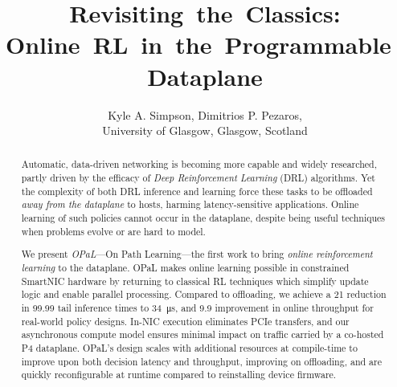 \documentclass[
conference
,10pt
]{IEEEtran}
\newcommand{\approach}{On Path Learning}
\newcommand{\approachshort}{OPaL}
\begin{document}
	\title{Revisiting~the~Classics: Online~RL~in~the~Programmable~Dataplane}
	
	
	 \author{Kyle A. Simpson, Dimitrios P. Pezaros,\\University of Glasgow, Glasgow, Scotland}

%
%
	

\maketitle
	
\begin{abstract}
Automatic, data-driven networking is becoming more capable and widely researched, partly driven by the efficacy of \emph{Deep Reinforcement Learning} (DRL) algorithms.
Yet the complexity of both DRL inference and learning force these tasks to be offloaded \emph{away from the dataplane} to hosts, harming latency-sensitive applications.
Online learning of such policies cannot occur in the dataplane, despite being useful techniques when problems evolve or are hard to model.

We present \emph{\approachshort{}}---\approach{}---the first work to bring \emph{online reinforcement learning} to the dataplane.
\approachshort{} makes online learning possible in constrained SmartNIC hardware by returning to classical RL techniques which simplify update logic and enable parallel processing.
Compared to offloading, we achieve a \SI{21}{\texttimes} reduction in \num{99.99} tail inference times to \SI{34}{\micro\second}, and \SI{9.9}{\texttimes} improvement in online throughput for real-world policy designs.
In-NIC execution eliminates PCIe transfers, and our asynchronous compute model ensures minimal impact on traffic carried by a co-hosted P4 dataplane.
\approachshort{}'s design scales with additional resources at compile-time to improve upon both decision latency and throughput, improving on offloading, and are quickly reconfigurable at runtime compared to reinstalling device firmware.

\end{abstract}
\end{document}
